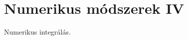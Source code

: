 \documentclass[../../main.tex]{subfiles}
\begin{document}
\section{Numerikus módszerek IV}

\begin{fulltheorem}
	Numerikus integrálás.
\end{fulltheorem}
\end{document}

